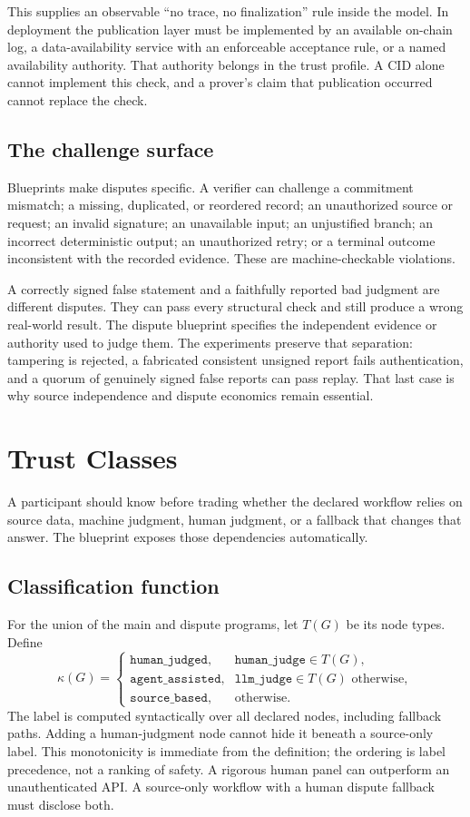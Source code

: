 \documentclass[10pt]{article}
\begin{document}
This supplies an observable ``no trace, no finalization'' rule inside the model. In deployment the publication layer must be implemented by an available on-chain log, a data-availability service with an enforceable acceptance rule, or a named availability authority. That authority belongs in the trust profile. A CID alone cannot implement this check, and a prover's claim that publication occurred cannot replace the check.

\subsection{The challenge surface}

Blueprints make disputes specific. A verifier can challenge a commitment mismatch; a missing, duplicated, or reordered record; an unauthorized source or request; an invalid signature; an unavailable input; an unjustified branch; an incorrect deterministic output; an unauthorized retry; or a terminal outcome inconsistent with the recorded evidence. These are machine-checkable violations.

A correctly signed false statement and a faithfully reported bad judgment are different disputes. They can pass every structural check and still produce a wrong real-world result. The dispute blueprint specifies the independent evidence or authority used to judge them. The experiments preserve that separation: tampering is rejected, a fabricated consistent unsigned report fails authentication, and a quorum of genuinely signed false reports can pass replay. That last case is why source independence and dispute economics remain essential.

\section{Trust Classes}
\label{sec:trustclasses}

A participant should know before trading whether the declared workflow relies on source data, machine judgment, human judgment, or a fallback that changes that answer. The blueprint exposes those dependencies automatically.

\subsection{Classification function}

For the union of the main and dispute programs, let $T(G)$ be its node types. Define
\[
\kappa(G)=\begin{cases}
\texttt{human\_judged},&\texttt{human\_judge}\in T(G),\\
\texttt{agent\_assisted},&\texttt{llm\_judge}\in T(G)\text{ otherwise},\\
\texttt{source\_based},&\text{otherwise}.
\end{cases}
\]
The label is computed syntactically over all declared nodes, including fallback paths. Adding a human-judgment node cannot hide it beneath a source-only label. This monotonicity is immediate from the definition; the ordering is label precedence, not a ranking of safety. A rigorous human panel can outperform an unauthenticated API. A source-only workflow with a human dispute fallback must disclose both.
\end{document}
